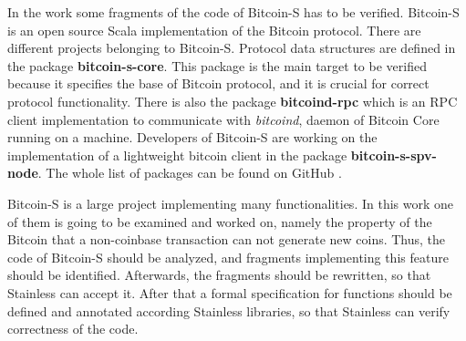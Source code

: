 In the work some fragments of the code of Bitcoin-S has to be verified.
Bitcoin-S is an open source Scala implementation of the Bitcoin protocol. 
There are different projects belonging to Bitcoin-S.
Protocol data structures are defined in the package \textbf{bitcoin-s-core}.
This package is the main target to be verified because it specifies the base of Bitcoin protocol, and it is crucial for correct protocol functionality.
There is also the package \textbf{bitcoind-rpc} which is an RPC client implementation to communicate with \textit{bitcoind}, daemon of Bitcoin Core running on a machine.
Developers of Bitcoin-S are working on the implementation of a lightweight bitcoin client in the package \textbf{bitcoin-s-spv-node}.
The whole list of packages can be found on GitHub \cite{BitcoinSProject}.

Bitcoin-S is a large project implementing many functionalities.
In this work one of them is going to be examined and worked on, namely the property of the Bitcoin that a non-coinbase transaction can not generate new coins.
Thus, the code of Bitcoin-S should be analyzed, and fragments implementing this feature should be identified.
Afterwards, the fragments should be rewritten, so that Stainless can accept it.
After that a formal specification for functions should be defined and annotated according Stainless libraries, so that Stainless can verify correctness of the code.



